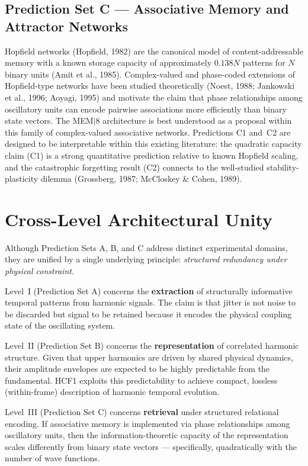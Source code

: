 \documentclass[11pt, a4paper]{article}
\newcommand{\hcf}{HCF1}
\begin{document}
\subsection{Prediction Set C — Associative Memory and Attractor Networks}

Hopfield networks (Hopfield, 1982) are the canonical model of content-addressable
memory with a known storage capacity of approximately $0.138N$ patterns for $N$
binary units (Amit et al., 1985).  Complex-valued and phase-coded extensions of
Hopfield-type networks have been studied theoretically (Noest, 1988; Jankowski
et al., 1996; Aoyagi, 1995) and motivate the claim that phase relationships among
oscillatory units can encode pairwise associations more efficiently than binary
state vectors.  The MEM$|$8 architecture is best understood as a proposal within
this family of complex-valued associative networks.  Predictions C1 and~C2 are
designed to be interpretable within this existing literature: the quadratic
capacity claim (C1) is a strong quantitative prediction relative to known Hopfield
scaling, and the catastrophic forgetting result (C2) connects to the well-studied
stability-plasticity dilemma (Grossberg, 1987; McCloskey \& Cohen, 1989).

\section{Cross-Level Architectural Unity}

Although Prediction Sets A, B, and C address distinct experimental domains, they
are unified by a single underlying principle: \emph{structured redundancy under
physical constraint}.

Level~I (Prediction Set A) concerns the \textbf{extraction} of structurally
informative temporal patterns from harmonic signals.  The claim is that jitter is
not noise to be discarded but signal to be retained because it encodes the physical
coupling state of the oscillating system.

Level~II (Prediction Set B) concerns the \textbf{representation} of correlated
harmonic structure.  Given that upper harmonics are driven by shared physical
dynamics, their amplitude envelopes are expected to be highly predictable from the
fundamental.  \hcf{} exploits this predictability to achieve compact, lossless
(within-frame) description of harmonic temporal evolution.

Level~III (Prediction Set C) concerns \textbf{retrieval} under structured relational
encoding.  If associative memory is implemented via phase relationships among
oscillatory units, then the information-theoretic capacity of the representation
scales differently from binary state vectors — specifically, quadratically with the
number of wave functions.
\end{document}
